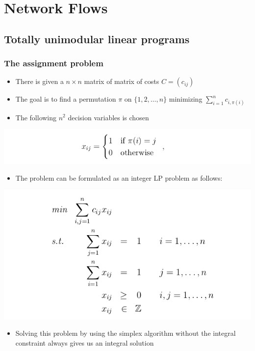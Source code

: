 \documentclass[11pt]{article}
\begin{document}
\section{Network Flows}
\label{sec:org98f9e6d}
\subsection{Totally unimodular linear programs}
\label{sec:orgab2ed79}
\subsubsection{The assignment problem}
\label{sec:org4f4bf65}
\begin{itemize}
\item There is given a \(n \times n\) matrix of matrix of costs \(C=(c_{ij})\)
\item The goal is to find a permutation \(\pi\) on \(\{1,2, \dots, n\}\) minimizing \(\sum_{i=1}^n c_{i,\pi(i)}\)
\item The following \(n^2\) decision variables is chosen
\end{itemize}
\begin{center}
\includegraphics[width=.9\linewidth]{Network Flows/screenshot_2019-02-24_14-17-45.png}
\end{center}

\begin{itemize}
\item The problem can be formulated as an integer LP problem as follows:
\end{itemize}
\begin{center}
\includegraphics[width=.9\linewidth]{Network Flows/screenshot_2019-02-24_14-18-01.png}
\end{center}
\begin{itemize}
\item Solving this problem by using the simplex algorithm without the integral constraint always gives us an integral solution
\end{itemize}
\end{document}

